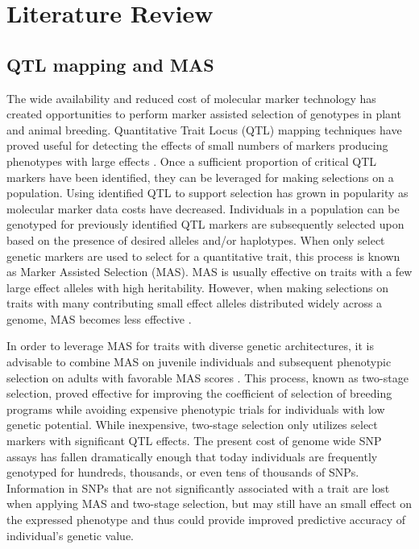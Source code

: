 \section{Literature Review} \label{sec:lit-review}

\subsection*{QTL mapping and MAS}

The wide availability and reduced cost of molecular marker technology
has created opportunities to perform marker assisted selection of genotypes
in plant and animal breeding. Quantitative Trait Locus (QTL) mapping techniques
have proved useful for detecting the effects of small numbers of markers producing 
phenotypes with large effects \citep{miles2008}. Once a sufficient proportion of
critical QTL markers have been identified, they can be leveraged for making selections
on a population. Using identified QTL to support selection has grown in popularity
as molecular marker data costs have decreased. Individuals in a population
can be genotyped for previously identified QTL markers are subsequently selected 
upon based on the presence of desired alleles and/or haplotypes.
When only select genetic markers are used to select for a quantitative trait,
this process is known as Marker Assisted Selection (MAS). MAS is usually effective on
traits with a few large effect alleles with high heritability. However, when making selections 
on traits with many contributing small effect alleles distributed widely 
across a genome, MAS becomes less effective \citep{heffner2009}. 

In order to leverage MAS for traits with diverse genetic architectures, it is
advisable to combine MAS on juvenile individuals and subsequent phenotypic
selection on adults with favorable MAS scores \citep{lande1990}. This process, 
known as two-stage selection, proved effective for improving
the coefficient of selection of breeding programs while avoiding expensive phenotypic
trials for individuals with low genetic potential. While inexpensive, two-stage selection 
only utilizes select markers with significant QTL effects. The present cost of
genome wide SNP assays has fallen dramatically enough that today individuals are
frequently genotyped for hundreds, thousands, or even tens of thousands of SNPs. 
Information in SNPs that are not significantly associated with a trait are lost 
when applying MAS and two-stage selection, but may still have an small effect on the
expressed phenotype and thus could provide improved predictive 
accuracy of individual's genetic value.

